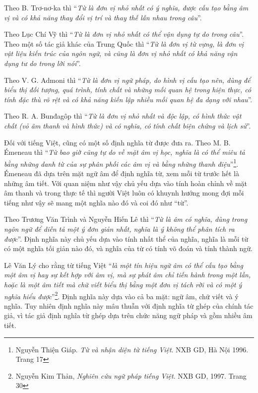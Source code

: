 \documentclass[a4paper,oneside,14pt]{extbook} %
\begin{document}
Theo B. Trơ-nơ-ka thì ``\textit{Từ là đơn vị nhỏ nhất có ý nghĩa, được cấu tạo
bằng âm vị và có khả năng thay đổi vị trí và thay thế lẫn nhau trong
câu}''. 

Theo Lục Chí Vỹ thì ``\textit{Từ là đơn vị nhỏ nhất có thể vận dụng tự do
trong câu}''. 
Theo một số tác giả khác của Trung Quốc thì ``\textit{Từ là đơn vị từ vựng, là
đơn vị vật liệu kiến trúc của ngôn ngữ, và cũng là đơn vị nhỏ nhất có
khả năng vận dụng tư do trong lời nói}''. 

Theo V. G. Admoni thì ``\textit{Từ là đơn vị ngữ pháp, do hình vị cấu tạo nên,
dùng để biểu thị đối tượng, quá trình, tính chất và những mối quan hệ
trong hiện thực, có tính đặc thù rõ rệt và có khả năng kiến lập nhiều
mối quan hệ đa dạng với nhau}''. 

Theo R. A. Bunđagôp thì ``\textit{Từ là đơn vị nhỏ nhất và độc lập, có hình
thức vật chất (vỏ âm thanh và hình thức) và có nghĩa, có tính chất
biện chứng và lịch sử}''.

Đối với tiếng Việt, cũng có một số định nghĩa từ được đưa ra. Theo
M. B. Émeneau thì ``\textit{Từ bao giờ cũng tự do về mặt âm vị học, nghĩa là
có thể miêu tả bằng những danh từ của sự phân phối các âm vị và bằng
những thanh điệu}''\footnote{Nguyễn Thiện Giáp. {\em Từ và nhận diện từ
  tiếng Việt}. NXB GD, Hà Nội 1996. Trang 17}. Émeneau đã dựa trên mặt
ngữ âm để định nghĩa từ, xem mỗi từ trước hết là những âm tiết. Với
quan niệm như vậy chủ yếu dựa vào tính hoàn chỉnh về mặt âm thanh và
trong thực tế thì người Việt luôn có khuynh hướng mong đợi mỗi tiếng
như vậy sẽ mang một nghĩa nào đó và coi đó như ``từ''.

Theo Trương Văn Trình và Nguyễn Hiến Lê thì ``\textit{Từ là âm có nghĩa, dùng
trong ngôn ngữ để diễn tả một ý đơn giản nhất, nghĩa là ý không thể
phân tích ra được}''. Định nghĩa này chủ yếu dựa vào tính nhất thể của
nghĩa, nghĩa là mỗi từ có một nghĩa tối giản nào đó, và nghĩa của từ
có tính võ đoán và tính thành ngữ.

Lê Văn Lý cho rằng từ tiếng Việt ``\textit{là một tín hiệu ngữ âm có thể cấu
tạo bằng một âm vị hay sự kết hợp với âm vị, mà sự phát âm chỉ tiến
hành trong một lần, hoặc là một âm tiết mà chữ viết biểu thị bằng một
đơn vị tách rời và có một ý nghĩa hiểu được}''\footnote{Nguyễn
  Kim Thản, {\em Nghiên cứu ngữ pháp tiếng Việt}. NXB GD, 1997. Trang
  30}. Định nghĩa này dựa vào cả ba mặt: ngữ âm, chữ viết và ý
nghĩa. Tuy nhiên định nghĩa này mâu thuẫn với định nghĩa từ ghép của
chính tác giả, vì tác giả định nghĩa từ ghép dựa trên chức năng ngữ
pháp và gồm nhiều âm tiết.
\end{document}
